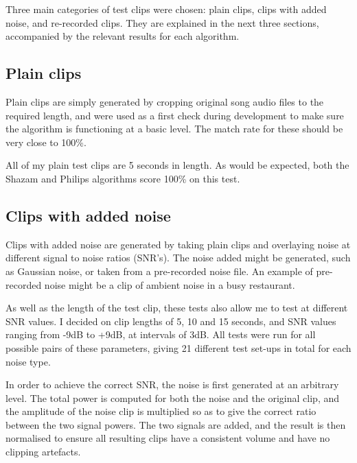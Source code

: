 \documentclass[12pt,a4paper,twoside,openright]{report}
\begin{document}
Three main categories of test clips were chosen: plain clips, clips with added noise, and re-recorded clips. They are explained in the next three sections, accompanied by the relevant results for each algorithm.


\subsection{Plain clips}

Plain clips are simply generated by cropping original song audio files to the required length, and were used as a first check during development to make sure the algorithm is functioning at a basic level. The match rate for these should be very close to 100\%.

All of my plain test clips are 5 seconds in length. As would be expected, both the Shazam and Philips algorithms score 100\% on this test.


\subsection{Clips with added noise}

Clips with added noise are generated by taking plain clips and overlaying noise at different signal to noise ratios (SNR's). The noise added might be generated, such as Gaussian noise, or taken from a pre-recorded noise file. An example of pre-recorded noise might be a clip of ambient noise in a busy restaurant.

As well as the length of the test clip, these tests also allow me to test at different SNR values. I decided on clip lengths of 5, 10 and 15 seconds, and SNR values ranging from -9dB to +9dB, at intervals of 3dB. All tests were run for all possible pairs of these parameters, giving 21 different test set-ups in total for each noise type. 

In order to achieve the correct SNR, the noise is first generated at an arbitrary level. The total power is computed for both the noise and the original clip, and the amplitude of the noise clip is multiplied so as to give the correct ratio between the two signal powers. The two signals are added, and the result is then normalised to ensure all resulting clips have a consistent volume and have no clipping artefacts.
\end{document}
